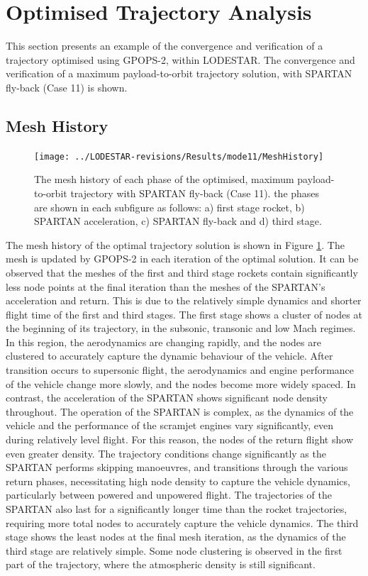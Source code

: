 \section{Optimised Trajectory Analysis}

This section presents an example of the convergence and verification of a trajectory optimised using GPOPS-2, within LODESTAR. The convergence and verification of a maximum payload-to-orbit trajectory solution, with SPARTAN fly-back (Case 11) is shown. 

\subsection{Mesh History}

\begin{figure}[ht]
	\centering
	\texttt{[image: ../LODESTAR-revisions/Results/mode11/MeshHistory]}
	\caption{The mesh history of each phase of the optimised, maximum payload-to-orbit trajectory with SPARTAN fly-back (Case 11). the phases are shown in each subfigure as follows: a) first stage rocket, b) SPARTAN acceleration, c) SPARTAN fly-back and d) third stage.}
	\label{fig:MeshHistory}
\end{figure}
The mesh history of the optimal trajectory solution is shown in Figure \ref{fig:MeshHistory}. The mesh is updated by GPOPS-2 in each iteration of the optimal solution. It can be observed that the meshes of the first and third stage rockets contain significantly less node points at the final iteration than the meshes of the SPARTAN's acceleration and return. This is due to the relatively simple dynamics and shorter flight time of the first and third stages. The first stage shows a cluster of nodes at the beginning of its trajectory, in the subsonic, transonic and low Mach regimes. In this region, the aerodynamics are changing rapidly, and the nodes are clustered to accurately capture the dynamic behaviour of the vehicle. After transition occurs to supersonic flight, the aerodynamics and engine performance of the vehicle change more slowly, and the nodes become more widely spaced. In contrast, the acceleration of the SPARTAN shows significant node density throughout. The operation of the SPARTAN is complex, as the dynamics of the vehicle and the performance of the scramjet engines vary significantly, even during relatively level flight. For this reason, the nodes of the return flight show even greater density. The trajectory conditions change significantly as the SPARTAN performs skipping manoeuvres, and transitions through the various return phases, necessitating high node density to capture the vehicle dynamics, particularly between powered and unpowered flight. The trajectories of the SPARTAN also last for a significantly longer time than the rocket trajectories, requiring more total nodes to accurately capture the vehicle dynamics. The third stage shows the least nodes at the final mesh iteration, as the dynamics of the third stage are relatively simple. Some node  clustering is observed in the first part of the trajectory, where the atmospheric density is still significant. 



